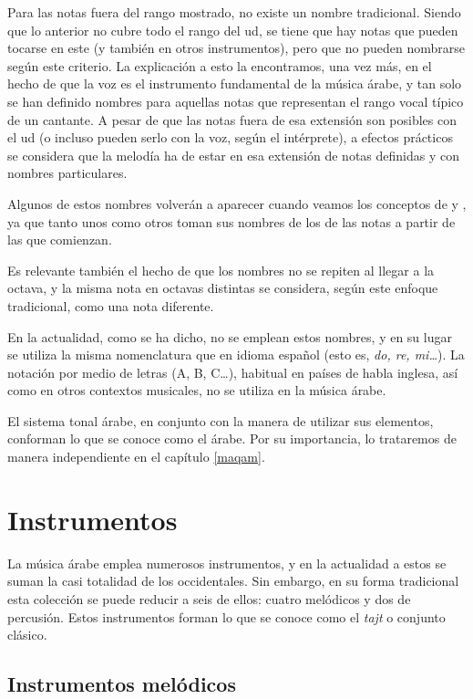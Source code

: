 \vspace*{0.5cm}

Para las notas fuera del rango mostrado, no existe un nombre tradicional. Siendo que lo anterior no cubre todo el rango del ud, se tiene que hay notas que pueden tocarse en este (y también en otros instrumentos), pero que no pueden nombrarse según este criterio. La explicación a esto la encontramos, una vez más, en el hecho de que la voz es el instrumento fundamental de la música árabe, y tan solo se han definido nombres para aquellas notas que representan el rango vocal típico de un cantante. A pesar de que las notas fuera de esa extensión son posibles con el ud (o incluso pueden serlo con la voz, según el intérprete), a efectos prácticos se considera que la melodía ha de estar en esa extensión de notas definidas y con nombres particulares.

Algunos de estos nombres volverán a aparecer cuando veamos los conceptos de \yins y \maqamb, ya que tanto unos como otros toman sus nombres de los de las notas a partir de las que comienzan.

Es relevante también el hecho de que los nombres no se repiten al llegar a la octava, y la misma nota en octavas distintas se considera, según este enfoque tradicional, como una nota diferente.

En la actualidad, como se ha dicho, no se emplean estos nombres, y en su lugar se utiliza la misma nomenclatura que en idioma español (esto es, \emph{do, re, mi\ldots}). La notación por medio de letras (A, B, C\ldots), habitual en países de habla inglesa, así como en otros contextos musicales, no se utiliza en la música árabe.

El sistema tonal árabe, en conjunto con la manera de utilizar sus elementos, conforman lo que se conoce como el \maqam árabe. Por su importancia, lo trataremos de manera independiente en el capítulo \ref{maqam}.

\section{Instrumentos}
\label{instrumentos}

    La música árabe emplea numerosos instrumentos, y en la actualidad a estos se suman la casi totalidad de los occidentales. Sin embargo, en su forma tradicional esta colección se puede reducir a seis de ellos: cuatro melódicos y dos de percusión. Estos instrumentos forman lo que se conoce como el \emph{tajt} o conjunto clásico.

    \subsection{Instrumentos melódicos}

